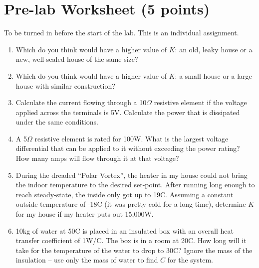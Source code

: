 \documentclass[11pt]{article} %
\begin{document}
\section{Pre-lab Worksheet (5 points)}
\label{sec:prelab}
To be turned in before the start of the lab. This is an individual assignment.
\begin{enumerate}
\item Which do you think would have a higher value of $K$: an old, leaky house or a new, well-sealed house of the same size?
\vspace{0.75in}
\item Which do you think would have a higher value of $K$: a small house or a large house with similar construction?
\vspace{0.75in}
\item Calculate the current flowing through a 10$\Omega$ resistive element if the voltage applied across the terminals is 5V. Calculate the power that is dissipated under the same conditions.
\vspace{0.75in}
\item A 5$\Omega$ resistive element is rated for 100W. What is the largest voltage differential that can be applied to it without exceeding the power rating? How many amps will flow through it at that voltage?
\vspace{0.75in}
\item During the dreaded ``Polar Vortex'', the heater in my house could not bring the indoor temperature to the desired set-point. After running long enough to reach steady-state, the inside only got up to 19C. Assuming a constant outside temperature of -18C (it was pretty cold for a long time), determine $K$ for my house if my heater puts out 15,000W.
\vspace{0.75in}
\item 10kg of water at 50C is placed in an insulated box with an overall heat transfer coefficient of 1W/C. The box is in a room at 20C. How long will it take for the temperature of the water to drop to 30C? Ignore the mass of the insulation -- use only the mass of water to find $C$ for the system.
\vspace{0.75in}

\end{enumerate}
\end{document}
